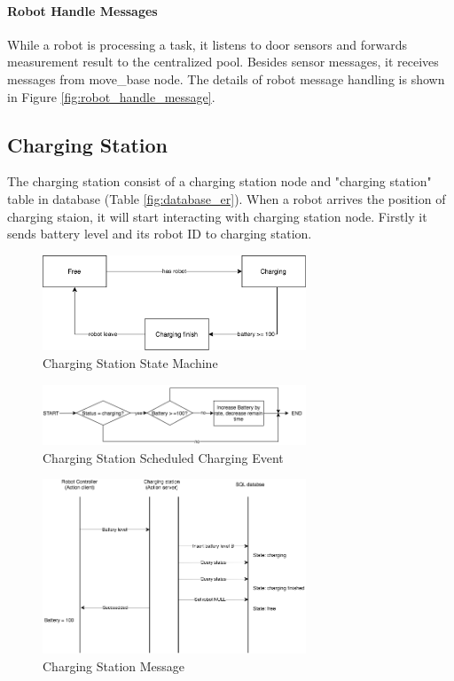 \paragraph{Robot Handle Messages}
While a robot is processing a task, it listens to door sensors and forwards measurement result to the centralized pool. 
Besides sensor messages, it receives messages from move\_base node. The details of robot message handling is shown in Figure \ref{fig:robot_handle_message}.

\subsection{Charging Station}
\label{sec:charging_station}
The charging station consist of a charging station node and "charging station" table in database (Table \ref{fig:database_er}). 
When a robot arrives the position of charging staion, it will start interacting with charging station node. Firstly it sends battery level and its robot ID to charging station. 

\begin{figure}[htbp]
    \centering
    \includegraphics[width = 0.7\textwidth]{content/images/ch4/charging_station_state_machine.drawio.png}
    \caption{Charging Station State Machine}
    \label{fig:charging_station_state_machine}
\end{figure}

\begin{figure}[htbp]
    \centering
    \includegraphics[width = 0.7\textwidth]{content/images/ch4/charging_station_charging_event.drawio.png}
    \caption{Charging Station Scheduled Charging Event}
    \label{fig:charging_station_event}
\end{figure}

\begin{figure}[htbp]
    \centering
    \includegraphics[width = 0.7\textwidth]{content/images/ch4/charging_station_message.drawio.png}
    \caption{Charging Station Message}
    \label{fig:charging_station_message}
\end{figure}
